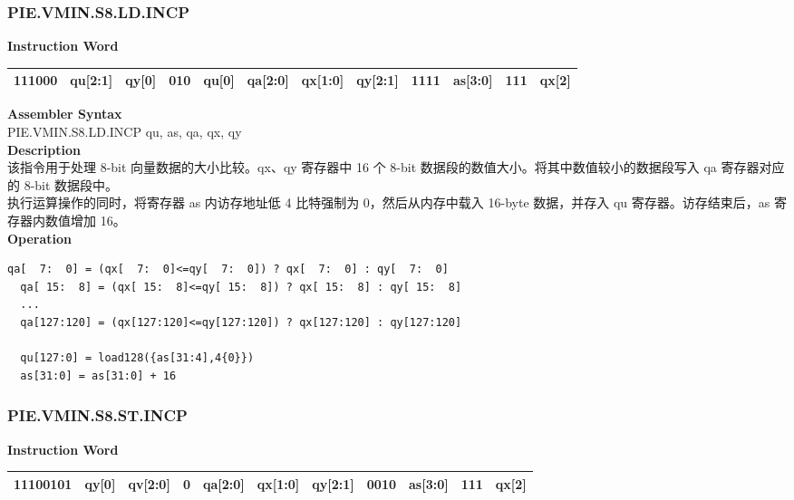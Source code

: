 \newpage
\subsubsection{PIE.VMIN.S8.LD.INCP}\label{instruction:PIEVMINS8LDINCP}
\setlength\tabcolsep{6pt}
\textbf{Instruction Word} \\
\begin{tabular}{|c|c|c|c|c|c|c|c|c|c|c|c|}
	\hline
	111000 & qu[2:1] & qy[0] & 010 & qu[0] & qa[2:0] & qx[1:0] & qy[2:1] & 1111 & as[3:0] & 111 & qx[2] \\
	\hline
\end{tabular}

\textbf{Assembler Syntax} \\
PIE.VMIN.S8.LD.INCP qu, as, qa, qx, qy \\
\textbf{Description} \\
该指令用于处理 8-bit 向量数据的大小比较。qx、qy 寄存器中 16 个 8-bit 数据段的数值大小。将其中数值较小的数据段写入 qa 寄存器对应的 8-bit 数据段中。\\
执行运算操作的同时，将寄存器 as 内访存地址低 4 比特强制为 0，然后从内存中载入 16-byte 数据，并存入 qu 寄存器。访存结束后，as 寄存器内数值增加 16。\\
\textbf{Operation}
\begin{lstlisting}[escapeinside=`?]
  qa[  7:  0] = (qx[  7:  0]<=qy[  7:  0]) ? qx[  7:  0] : qy[  7:  0]
  qa[ 15:  8] = (qx[ 15:  8]<=qy[ 15:  8]) ? qx[ 15:  8] : qy[ 15:  8]
  ...
  qa[127:120] = (qx[127:120]<=qy[127:120]) ? qx[127:120] : qy[127:120]

  qu[127:0] = load128({as[31:4],4{0}})
  as[31:0] = as[31:0] + 16
\end{lstlisting}

\newpage
\subsubsection{PIE.VMIN.S8.ST.INCP}\label{instruction:PIEVMINS8STINCP}
\setlength\tabcolsep{6pt}
\textbf{Instruction Word} \\
\begin{tabular}{|c|c|c|c|c|c|c|c|c|c|c|}
	\hline
	11100101 & qy[0] & qv[2:0] & 0 & qa[2:0] & qx[1:0] & qy[2:1] & 0010 & as[3:0] & 111 & qx[2] \\
	\hline
\end{tabular}

